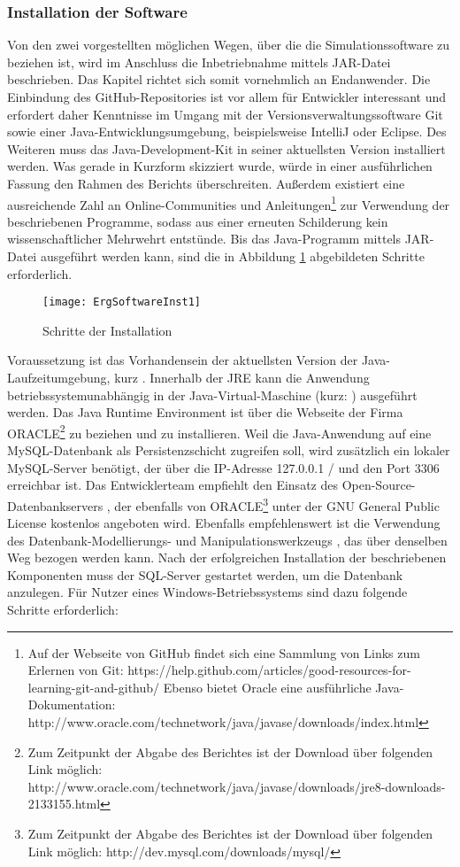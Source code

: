\subsubsection{Installation der Software}
Von den zwei vorgestellten möglichen Wegen, über die die Simulationssoftware zu beziehen ist, wird im Anschluss die Inbetriebnahme mittels JAR-Datei beschrieben. Das Kapitel richtet sich somit vornehmlich an Endanwender.
Die Einbindung des GitHub-Repositories ist vor allem für Entwickler interessant und erfordert daher Kenntnisse im Umgang mit der Versionsverwaltungssoftware Git sowie einer Java-Entwicklungsumgebung, beispielsweise IntelliJ oder Eclipse. Des Weiteren muss das Java-Development-Kit in seiner aktuellsten Version installiert werden. Was gerade in Kurzform skizziert wurde, würde in einer ausführlichen Fassung den Rahmen des Berichts überschreiten. Außerdem existiert eine ausreichende Zahl an Online-Communities und Anleitungen\footnote{Auf der Webseite von GitHub findet sich eine Sammlung von Links zum Erlernen von Git: https://help.github.com/articles/good-resources-for-learning-git-and-github/
Ebenso bietet Oracle eine ausführliche Java-Dokumentation: http://www.oracle.com/technetwork/java/javase/downloads/index.html} zur Verwendung der beschriebenen Programme, sodass aus einer erneuten Schilderung kein wissenschaftlicher Mehrwehrt entstünde.
Bis das Java-Programm mittels JAR-Datei ausgeführt werden kann, sind die in Abbildung \ref{fig:ErgSoftwareInst1} abgebildeten Schritte erforderlich.
\begin{figure}[ht]
	\centering
	\texttt{[image: ErgSoftwareInst1]}
	\caption{Schritte der Installation}
	\label{fig:ErgSoftwareInst1}
\end{figure}
Voraussetzung ist das Vorhandensein der aktuellsten Version der Java-Laufzeitumgebung, kurz . Innerhalb der JRE kann die Anwendung betriebssystemunabhängig in der Java-Virtual-Maschine (kurz: ) ausgeführt werden. Das Java Runtime Environment ist über die Webseite der Firma ORACLE\footnote{Zum Zeitpunkt der Abgabe des Berichtes ist der Download über folgenden Link möglich: http://www.oracle.com/technetwork/java/javase/downloads/jre8-downloads-2133155.html} zu beziehen und zu installieren.
Weil die Java-Anwendung auf eine MySQL-Datenbank als Persistenzschicht zugreifen soll, wird zusätzlich ein lokaler MySQL-Server benötigt, der über die IP-Adresse 127.0.0.1 /  und den Port 3306 erreichbar ist. Das Entwicklerteam empfiehlt den Einsatz des Open-Source-Datenbankservers , der ebenfalls von ORACLE\footnote{Zum Zeitpunkt der Abgabe des Berichtes ist der Download über folgenden Link möglich: http://dev.mysql.com/downloads/mysql/} unter der GNU General Public License kostenlos angeboten wird. Ebenfalls empfehlenswert ist die Verwendung des Datenbank-Modellierungs- und Manipulationswerkzeugs , das über denselben Weg bezogen werden kann.
Nach der erfolgreichen Installation der beschriebenen Komponenten muss der SQL-Server gestartet werden, um die Datenbank anzulegen. Für Nutzer eines Windows-Betriebssystems sind dazu folgende Schritte erforderlich:

